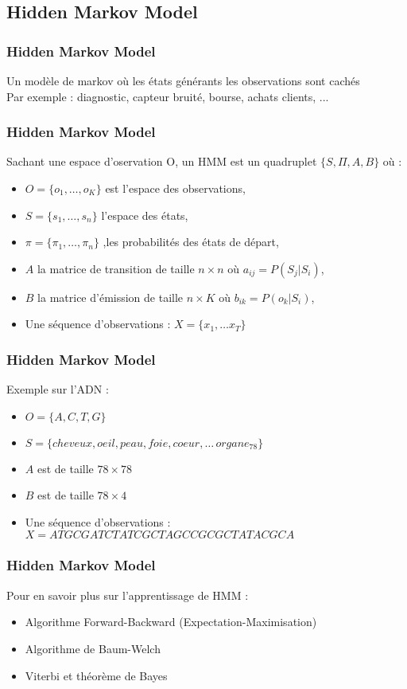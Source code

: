 \subsection{Hidden Markov Model}

\begin{frame}
  \frametitle{Hidden Markov Model}
  Un modèle de markov où les états générants les observations sont cachés \\
  Par exemple : diagnostic, capteur bruité, bourse, achats clients, ...
\end{frame}

\begin{frame}
  \frametitle{Hidden Markov Model}
  Sachant une espace d'oservation O, un HMM est un quadruplet $\{S,\Pi,A,B\}$ où :
  \begin{itemize}
  \item $O = \{o_1, \dotsc, o_K \}$ est l'espace des observations,
  \item $S = \{s_1, \dotsc, s_n \}$ l'espace des états,
  \item $\pi = \{\pi_1, \dotsc, \pi_n \}$ ,les probabilités des états de départ,
  \item $A$ la matrice de transition de taille $n\times n$ où $a_{ij} = P(S_j|S_i)$,
  \item $B$ la matrice d'émission de taille $n\times K$ où $b_{ik} = P(o_k|S_i)$,
  \item Une séquence d'observations : $X=\{x_1, \dotsc x_T \}$
  \end{itemize}
\end{frame}

\begin{frame}
  \frametitle{Hidden Markov Model}
  Exemple sur l'ADN : 
  \begin{itemize}
  \item $O = \{A,C,T,G\}$ 
  \item $S =  \{cheveux, oeil, peau, foie, coeur,\dotsc\,organe_{78}\}$
  \item $A$ est de taille $78 \times 78$ 
  \item $B$ est de taille $78\times 4$
  \item Une séquence d'observations : $X=ATGCGATCTATCGCTAGCCGCGCTATACGCA$
  \end{itemize}
\end{frame}

\begin{frame}
  \frametitle{Hidden Markov Model}
  Pour en savoir plus sur l'apprentissage de HMM :
  \begin{itemize}
  \item Algorithme Forward-Backward (Expectation-Maximisation)
  \item Algorithme de Baum-Welch
  \item Viterbi et théorème de Bayes
  \end{itemize}
\end{frame}

